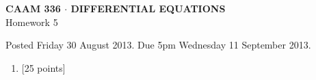 \documentclass[10pt]{article}
\begin{document}
\vspace*{-5em}
\begin{center}
\large \textsf{\textbf{CAAM 336 $\cdot$ DIFFERENTIAL EQUATIONS}\\[0.5em]
Homework 5 }
\end{center}

Posted Friday 30 August 2013.  Due 5pm Wednesday 11 September 2013.

\begin{enumerate}\addtocounter{enumi}{4}
\item {[25 points]}\\  

\end{enumerate}
\end{document}
